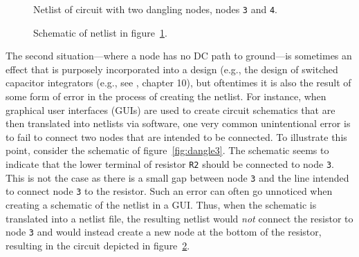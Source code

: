 \begin{figure}[htbp]
\begin{centering}
\caption[Netlist of circuit with two dangling nodes.] {Netlist of circuit with two dangling nodes, nodes \texttt{3} and 
\texttt{4}.}
\label{fig:nldangling1}
\end{centering}
\end{figure}

\begin{figure}[h]
\centering{}
\caption{Schematic of netlist in figure\ \ref{fig:nldangling1}.} 
\label{fig:dangle1}
\end{figure}

The second situation---where a node has no DC path to ground---is sometimes an
effect that is purposely incorporated into a design (e.g., the design of
switched capacitor integrators (e.g., see \cite{JohnsMartin}, chapter 10), but
oftentimes it is also the result of some form of error in the process of
creating the netlist.  For instance, when graphical user interfaces (GUIs) are
used to create circuit schematics that are then translated into netlists via
software, one very common unintentional error is to fail to connect two nodes
that are intended to be connected.  To illustrate this point, consider the
schematic of figure\ \ref{fig:dangle3}.  The schematic seems to indicate that
the lower terminal of resistor \texttt{R2} should be connected to node
\texttt{3}. This is not the case as there is a small gap between node
\texttt{3} and the line intended to connect node \texttt{3} to the resistor.
Such an error can often go unnoticed when creating a schematic of the netlist
in a GUI.  Thus, when the schematic is translated into a netlist file, the
resulting netlist would {\em not} connect the resistor to node \texttt{3} and
would instead create a new node at the bottom of the resistor, resulting in the
circuit depicted in figure\ \ref{fig:dangle1}.  


